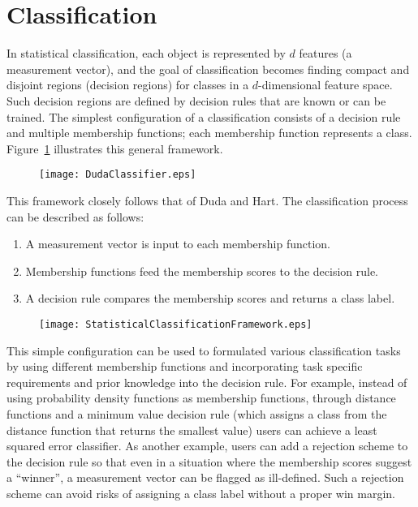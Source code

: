 \ifitkFullVersion

\fi



\section{Classification}
\label{sec:Classification}

In statistical classification, each object is represented by $d$ features (a
measurement vector), and the goal of classification becomes finding compact and
disjoint regions (decision regions\cite{Duda2000}) for classes in a
$d$-dimensional feature space. Such decision regions are defined by decision
rules that are known or can be trained.  The simplest configuration of a
classification consists of a decision rule and multiple membership functions;
each membership function represents a class. Figure~\ref{fig:simple}
illustrates this general framework.

\begin{figure}[h]
  \centering
  \texttt{[image: DudaClassifier.eps]}
  \label{fig:simple}
\end{figure}

This framework closely follows that of Duda and
Hart\cite{Duda2000}. The classification process can be described
as follows:

\begin{enumerate}
\item{A measurement vector is input to each membership function.}
\item{Membership functions feed the membership scores to the
    decision rule.}
\item{A decision rule compares the membership scores and returns a
    class label.}
\end{enumerate}

\begin{figure}
  \centering
  \texttt{[image: StatisticalClassificationFramework.eps]}
  \protect\label{fig:StatisticalClassificationFramework}
\end{figure}

This simple configuration can be used to formulated various classification
tasks by using different membership functions and incorporating task specific
requirements and prior knowledge into the decision rule. For example, instead
of using probability density functions as membership functions, through
distance functions and a minimum value decision rule (which assigns a class
from the distance function that returns the smallest value) users can achieve a
least squared error classifier. As another example, users can add a rejection
scheme to the decision rule so that even in a situation where the membership
scores suggest a ``winner'', a measurement vector can be flagged as ill-defined.
Such a rejection scheme can avoid risks of assigning a class label
without a proper win margin.

